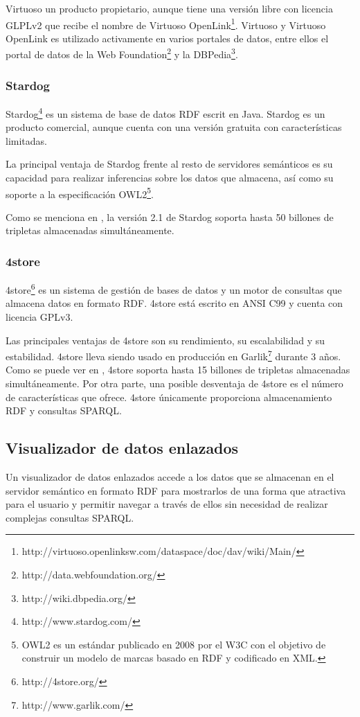 Virtuoso un producto propietario, aunque tiene una versión libre con licencia GLPLv2 que recibe el nombre de Virtuoso OpenLink\footnote{http://virtuoso.openlinksw.com/dataspace/doc/dav/wiki/Main/}. Virtuoso y Virtuoso OpenLink es utilizado activamente en varios portales de datos, entre ellos el portal de datos de la Web Foundation\footnote{http://data.webfoundation.org/} y la DBPedia\footnote{http://wiki.dbpedia.org/}.


\subsubsection{Stardog}
Stardog\footnote{http://www.stardog.com/} es un sistema de base de datos RDF escrit en Java. Stardog es un producto comercial, aunque cuenta con una versión gratuita con características limitadas.

La principal ventaja de Stardog frente al resto de servidores semánticos es su capacidad para realizar inferencias sobre los datos que almacena, así como su soporte a la especificación OWL2\footnote{OWL2 es un estándar publicado en 2008 por el W3C con el objetivo de construir un modelo de marcas basado en RDF y codificado en XML.}.

Como se menciona en \cite[]{largetriplestores}, la versión 2.1 de Stardog soporta hasta 50 billones de tripletas almacenadas simultáneamente.


\subsubsection{4store}
4store\footnote{http://4store.org/} es un sistema de gestión de bases de datos y un motor de consultas que almacena datos en formato RDF. 4store está escrito en ANSI C99 y cuenta con licencia GPLv3.

Las principales ventajas de 4store son su rendimiento, su escalabilidad y su estabilidad. 4store lleva siendo usado en producción en Garlik\footnote{http://www.garlik.com/} durante 3 años. Como se puede ver en \cite[]{largetriplestores}, 4store soporta hasta 15 billones de tripletas almacenadas simultáneamente.
Por otra parte, una posible desventaja de 4store es el número de características que ofrece. 4store únicamente proporciona almacenamiento RDF y consultas SPARQL.



\subsection{Visualizador de datos enlazados}
Un visualizador de datos enlazados accede a los datos que se almacenan en el servidor semántico en formato RDF para mostrarlos de una forma que atractiva para el usuario y permitir navegar a través de ellos sin necesidad de realizar complejas consultas SPARQL.


